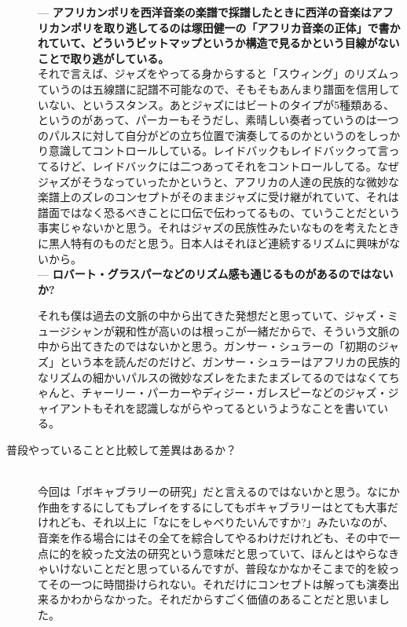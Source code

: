 \documentclass[uplatex,dvipdfmx]{ujarticle}
\begin{document}
\begin{description}
--- {\bf アフリカンポリを西洋音楽の楽譜で採譜したときに西洋の音楽はアフリカンポリを取り逃してるのは塚田健一の「アフリカ音楽の正体」で書かれていて、どういうビットマップというか構造で見るかという目線がないことで取り逃がしている。}\\

それで言えば、ジャズをやってる身からすると「スウィング」のリズムっていうのは五線譜に記譜不可能なので、そもそもあんまり譜面を信用していない、というスタンス。あとジャズにはビートのタイプが5種類ある、というのがあって、パーカーもそうだし、素晴しい奏者っていうのは一つのパルスに対して自分がどの立ち位置で演奏してるのかというのをしっかり意識してコントロールしている。レイドバックもレイドバックって言ってるけど、レイドバックには二つあってそれをコントロールしてる。なぜジャズがそうなっていったかというと、アフリカの人達の民族的な微妙な楽譜上のズレのコンセプトがそのままジャズに受け継がれていて、それは譜面ではなく恐るべきことに口伝で伝わってるもの、ていうことだという事実じゃないかと思う。それはジャズの民族性みたいなものを考えたときに黒人特有のものだと思う。日本人はそれほど連続するリズムに興味がないから。\\

--- {\bf ロバート・グラスパーなどのリズム感も通じるものがあるのではないか?}

それも僕は過去の文脈の中から出てきた発想だと思っていて、ジャズ・ミュージシャンが親和性が高いのは根っこが一緒だからで、そういう文脈の中から出てきたのではないかと思う。ガンサー・シュラーの「初期のジャズ」という本を読んだのだけど、ガンサー・シュラーはアフリカの民族的なリズムの細かいパルスの微妙なズレをたまたまズレてるのではなくてちゃんと、チャーリー・パーカーやディジー・ガレスピーなどのジャズ・ジャイアントもそれを認識しながらやってるというようなことを書いている。\\

\item [普段やっていることと比較して差異はあるか？]\mbox{}\\

今回は「ボキャブラリーの研究」だと言えるのではないかと思う。なにか作曲をするにしてもプレイをするにしてもボキャブラリーはとても大事だけれども、それ以上に「なにをしゃべりたいんですか?」みたいなのが、音楽を作る場合にはその全てを綜合してやるわけだけれども、その中で一点に的を絞った文法の研究という意味だと思っていて、ほんとはやらなきゃいけないことだと思っているんですが、普段なかなかそこまで的を絞ってその一つに時間掛けられない。それだけにコンセプトは解っても演奏出来るかわからなかった。それだからすごく価値のあることだと思いました。\\


\end{description}
\end{document}
